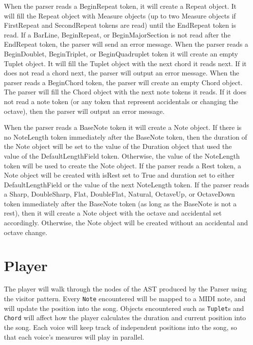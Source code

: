 \documentclass{article}
\begin{document}
When the parser reads a BeginRepeat token, it will create a Repeat object. It will fill the Repeat object with Measure objects (up to two Measure objects if FirstRepeat and SecondRepeat tokens are read) until the EndRepeat token is read. If a BarLine, BeginRepeat, or BeginMajorSection is not read after the EndRepeat token, the parser will send an error message.
When the parser reads a BeginDoublet, BeginTriplet, or BeginQuadruplet token it will create an empty Tuplet object. It will fill the Tuplet object with the next chord it reads next. If it does not read a chord next, the parser will output an error message.
When the parser reads a BeginChord token, the parser will create an empty Chord object. The parser will fill the Chord object with the next note tokens it reads. If it does not read a note token (or any token that represent accidentals or changing the octave), then the parser will output an error message.

	When the parser reads a BaseNote token it will create a Note object. If there is no NoteLength token immediately after the BaseNote token, then the duration of the Note object will be set to the value of the Duration object that used the value of the DefaultLengthField token. Otherwise, the value of the NoteLength token will be used to create the Note object. If the parser reads a Rest token, a Note object will be created with isRest set to True and duration set to either DefaultLengthField or the value of the next NoteLength token. If the parser reads a Sharp, DoubleSharp, Flat, DoubleFlat, Natural, OctaveUp, or OctaveDown token immediately after the BaseNote token (as long as the BaseNote is not a rest), then it will create a Note object with the octave and accidental set accordingly. Otherwise, the Note object will be created without an accidental and octave change. 

\section{Player}
The player will walk through the nodes of the AST produced by the Parser using the visitor pattern.
Every \texttt{Note} encountered will be mapped to a MIDI note, and will update the position into the song.
Objects encountered such as \texttt{Tuplet}s and \texttt{Chord} will affect how the player calculates the duration and current position into the song.
Each voice will keep track of independent positions into the song,
so that each voice's measures will play in parallel. 
\end{document}
